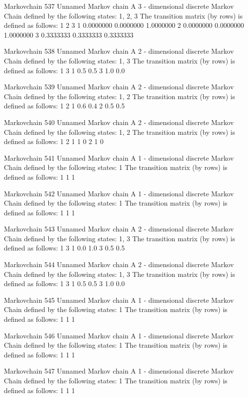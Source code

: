 \documentclass[
  nojss]{jss}
\begin{document}
\begin{CodeChunk}
\begin{CodeOutput}
Markovchain  537 
Unnamed Markov chain 
 A  3 - dimensional discrete Markov Chain defined by the following states: 
 1, 2, 3 
 The transition matrix  (by rows)  is defined as follows: 
          1         2         3
1 0.0000000 0.0000000 1.0000000
2 0.0000000 0.0000000 1.0000000
3 0.3333333 0.3333333 0.3333333

Markovchain  538 
Unnamed Markov chain 
 A  2 - dimensional discrete Markov Chain defined by the following states: 
 1, 3 
 The transition matrix  (by rows)  is defined as follows: 
    1   3
1 0.5 0.5
3 1.0 0.0

Markovchain  539 
Unnamed Markov chain 
 A  2 - dimensional discrete Markov Chain defined by the following states: 
 1, 2 
 The transition matrix  (by rows)  is defined as follows: 
    1   2
1 0.6 0.4
2 0.5 0.5

Markovchain  540 
Unnamed Markov chain 
 A  2 - dimensional discrete Markov Chain defined by the following states: 
 1, 2 
 The transition matrix  (by rows)  is defined as follows: 
  1 2
1 1 0
2 1 0

Markovchain  541 
Unnamed Markov chain 
 A  1 - dimensional discrete Markov Chain defined by the following states: 
 1 
 The transition matrix  (by rows)  is defined as follows: 
  1
1 1

Markovchain  542 
Unnamed Markov chain 
 A  1 - dimensional discrete Markov Chain defined by the following states: 
 1 
 The transition matrix  (by rows)  is defined as follows: 
  1
1 1

Markovchain  543 
Unnamed Markov chain 
 A  2 - dimensional discrete Markov Chain defined by the following states: 
 1, 3 
 The transition matrix  (by rows)  is defined as follows: 
    1   3
1 0.0 1.0
3 0.5 0.5

Markovchain  544 
Unnamed Markov chain 
 A  2 - dimensional discrete Markov Chain defined by the following states: 
 1, 3 
 The transition matrix  (by rows)  is defined as follows: 
    1   3
1 0.5 0.5
3 1.0 0.0

Markovchain  545 
Unnamed Markov chain 
 A  1 - dimensional discrete Markov Chain defined by the following states: 
 1 
 The transition matrix  (by rows)  is defined as follows: 
  1
1 1

Markovchain  546 
Unnamed Markov chain 
 A  1 - dimensional discrete Markov Chain defined by the following states: 
 1 
 The transition matrix  (by rows)  is defined as follows: 
  1
1 1

Markovchain  547 
Unnamed Markov chain 
 A  1 - dimensional discrete Markov Chain defined by the following states: 
 1 
 The transition matrix  (by rows)  is defined as follows: 
  1
1 1


\end{CodeOutput}
\end{CodeChunk}
\end{document}
